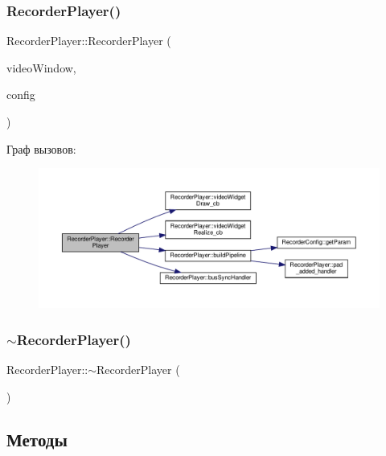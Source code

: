 \subsubsection{\texorpdfstring{Recorder\+Player()}{RecorderPlayer()}}
{\footnotesize\ttfamily Recorder\+Player\+::\+Recorder\+Player (\begin{DoxyParamCaption}\item[{Gtk\+Widget $\ast$}]{video\+Window,  }\item[{\hyperlink{class_recorder_config}{Recorder\+Config} $\ast$}]{config }\end{DoxyParamCaption})}

Граф вызовов\+:\nopagebreak
\begin{figure}[H]
\begin{center}
\leavevmode
\includegraphics[width=350pt]{class_recorder_player_a12a01ff15528f155880500982849f800_cgraph}
\end{center}
\end{figure}
\mbox{\label{class_recorder_player_af01cf1dba228330537e610a9de7decca}} 
\subsubsection{\texorpdfstring{$\sim$\+Recorder\+Player()}{~RecorderPlayer()}}
{\footnotesize\ttfamily Recorder\+Player\+::$\sim$\+Recorder\+Player (\begin{DoxyParamCaption}{ }\end{DoxyParamCaption})}



\subsection{Методы}
\mbox{\label{class_recorder_player_a2406c730cc930fb3aa800142c041a950}} 
